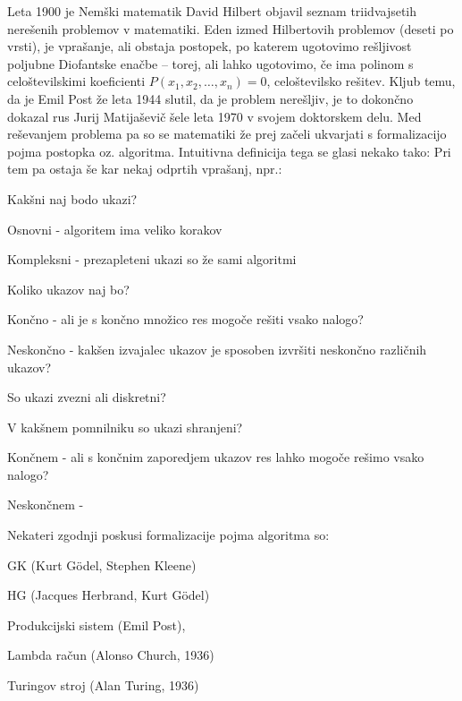 \documentclass[10pt,a4paper,oneside]{book}
\begin{document}
Leta 1900 je Nemški matematik David Hilbert objavil seznam triidvajsetih nerešenih problemov v matematiki. Eden izmed Hilbertovih problemov (deseti po vrsti), je vprašanje, ali obstaja postopek, po katerem ugotovimo rešljivost poljubne Diofantske enačbe -- torej, ali lahko ugotovimo, če ima polinom s celoštevilskimi koeficienti $P(x_1, x_2, \dots, x_n)=0$, celoštevilsko rešitev.
Kljub temu, da je Emil Post že leta 1944 slutil, da je problem nerešljiv, je to dokončno dokazal rus Jurij Matijaševič šele leta 1970 v svojem doktorskem delu. Med reševanjem problema pa so se matematiki že prej začeli ukvarjati s formalizacijo pojma postopka oz. algoritma. Intuitivna definicija tega se glasi nekako tako:
Pri tem pa ostaja še kar nekaj odprtih vprašanj, npr.:
\begin{items}
\item Kakšni naj bodo ukazi? 
	\begin{items}
	\item Osnovni - algoritem ima veliko korakov
	\item Kompleksni - prezapleteni ukazi so že sami algoritmi
	\end{items}
\item Koliko ukazov naj bo?
	\begin{items}
	\item Končno - ali je s končno množico res mogoče rešiti vsako nalogo?
	\item Neskončno - kakšen izvajalec ukazov je sposoben izvršiti neskončno različnih ukazov?
	\end{items}
\item So ukazi zvezni ali diskretni?
\item V kakšnem pomnilniku so ukazi shranjeni?
	\begin{items}%
	\item Končnem - ali s končnim zaporedjem ukazov res lahko mogoče rešimo vsako nalogo?
	\item Neskončnem - \fixme%
	\end{items}
\end{items}
Nekateri zgodnji poskusi formalizacije pojma algoritma so: \fixme%
\begin{items}
    \item GK (Kurt Gödel, Stephen Kleene) 
    \item HG (Jacques Herbrand, Kurt Gödel)
    \item Produkcijski sistem (Emil Post), %
    \item Lambda račun (Alonso Church, 1936)
    \item Turingov stroj (Alan Turing, 1936)
\end{items}
\end{document}
